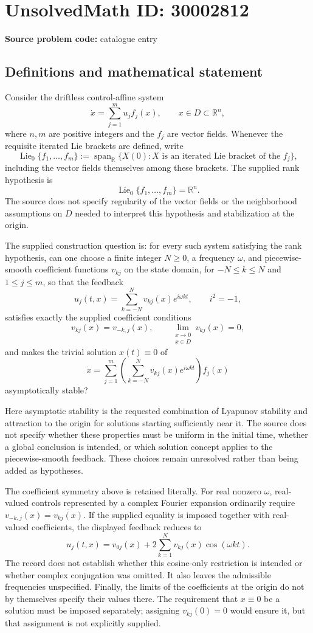 \documentclass[11pt]{article}
\newcommand{\R}{\mathbb{R}}
\begin{document}
\section*{UnsolvedMath ID: 30002812}
\textbf{Source problem code:} catalogue entry
\subsection{Definitions and mathematical statement}
Consider the driftless control-affine system
\[
\dot x=\sum_{j=1}^{m}u_j f_j(x),\qquad x\in D\subset\R^n,
\]
where \(n,m\) are positive integers and the \(f_j\) are vector fields. Whenever the requisite iterated Lie brackets are defined, write
\[
\operatorname{Lie}_{0}\{f_1,\ldots,f_m\}
:=\operatorname{span}_{\R}\{X(0):X\text{ is an iterated Lie bracket of the }f_j\},
\]
including the vector fields themselves among these brackets. The supplied rank hypothesis is
\[
\operatorname{Lie}_{0}\{f_1,\ldots,f_m\}=\R^n.
\]
The source does not specify regularity of the vector fields or the neighborhood assumptions on \(D\) needed to interpret this hypothesis and stabilization at the origin.

The supplied construction question is: for every such system satisfying the rank hypothesis, can one choose a finite integer \(N\geq0\), a frequency \(\omega\), and piecewise-smooth coefficient functions \(v_{kj}\) on the state domain, for \(-N\leq k\leq N\) and \(1\leq j\leq m\), so that the feedback
\[
u_j(t,x)=\sum_{k=-N}^{N}v_{kj}(x)e^{i\omega kt},\qquad i^2=-1,
\]
satisfies exactly the supplied coefficient conditions
\[
v_{kj}(x)=v_{-k,j}(x),\qquad
\lim_{\substack{x\to0\\x\in D}}v_{kj}(x)=0,
\]
and makes the trivial solution \(x(t)\equiv0\) of
\[
\dot x=\sum_{j=1}^{m}\left(\sum_{k=-N}^{N}v_{kj}(x)e^{i\omega kt}\right)f_j(x)
\]
asymptotically stable?

Here asymptotic stability is the requested combination of Lyapunov stability and attraction to the origin for solutions starting sufficiently near it. The source does not specify whether these properties must be uniform in the initial time, whether a global conclusion is intended, or which solution concept applies to the piecewise-smooth feedback. These choices remain unresolved rather than being added as hypotheses.

The coefficient symmetry above is retained literally. For real nonzero \(\omega\), real-valued controls represented by a complex Fourier expansion ordinarily require \(v_{-k,j}(x)=\overline{v_{kj}(x)}\). If the supplied equality is imposed together with real-valued coefficients, the displayed feedback reduces to
\[
u_j(t,x)=v_{0j}(x)+2\sum_{k=1}^{N}v_{kj}(x)\cos(\omega kt).
\]
The record does not establish whether this cosine-only restriction is intended or whether complex conjugation was omitted. It also leaves the admissible frequencies unspecified. Finally, the limits of the coefficients at the origin do not by themselves specify their values there. The requirement that \(x\equiv0\) be a solution must be imposed separately; assigning \(v_{kj}(0)=0\) would ensure it, but that assignment is not explicitly supplied.
\end{document}
